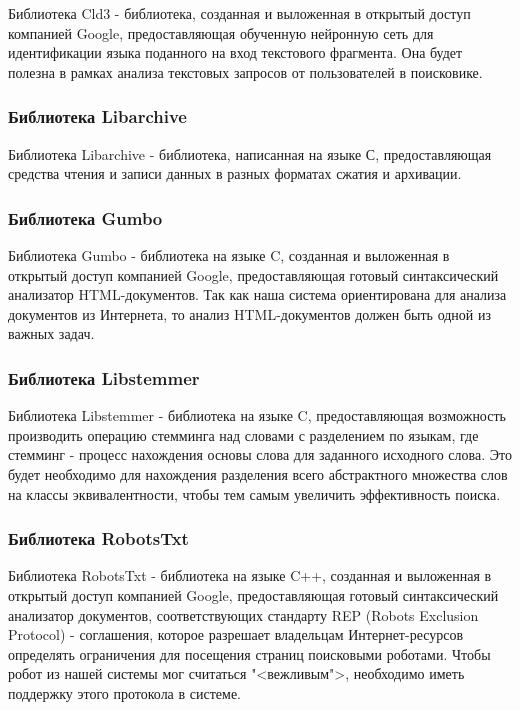 Библиотека Cld3 - библиотека, созданная и выложенная в открытый доступ компанией Google, предоставляющая обученную нейронную сеть для идентификации языка поданного на вход текстового фрагмента. Она будет полезна в рамках анализа текстовых запросов от пользователей в поисковике.

\subsubsection{Библиотека Libarchive}

Библиотека Libarchive - библиотека, написанная на языке С, предоставляющая средства чтения и записи данных в разных форматах сжатия и архивации.

\subsubsection{Библиотека Gumbo}

Библиотека Gumbo - библиотека на языке C, созданная и выложенная в открытый доступ компанией Google, предоставляющая готовый синтаксический анализатор HTML-документов. Так как наша система ориентирована для анализа документов из Интернета, то анализ HTML-документов должен быть одной из важных задач. 

\subsubsection{Библиотека Libstemmer}

Библиотека Libstemmer - библиотека на языке C, предоставляющая возможность производить операцию стемминга над словами с разделением по языкам, где стемминг - процесс нахождения основы слова для заданного исходного слова. Это будет необходимо для нахождения разделения всего абстрактного множества слов на классы эквивалентности, чтобы тем самым увеличить эффективность поиска. 

\subsubsection{Библиотека RobotsTxt}

Библиотека RobotsTxt - библиотека на языке C++, созданная и выложенная в открытый доступ компанией Google, предоставляющая готовый синтаксический анализатор документов, соответствующих стандарту REP (Robots Exclusion Protocol) - соглашения, которое разрешает владельцам Интернет-ресурсов определять ограничения для посещения страниц поисковыми роботами. Чтобы робот из нашей системы мог считаться "<вежливым">, необходимо иметь поддержку этого протокола в системе.


